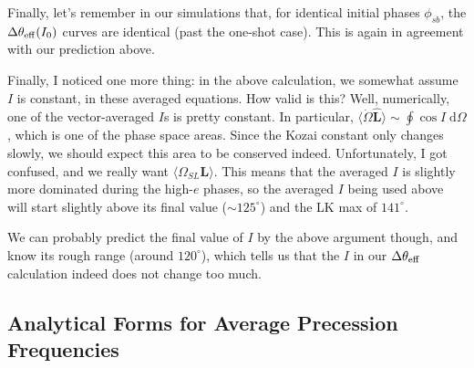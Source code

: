 \documentclass[11pt,
        usenames, %
        dvipsnames %
    ]{article}
\newcommand*{\bm}[1]{\boldsymbol{\mathbf{#1}}}
\newcommand*{\uv}[1]{\hat{\bm{#1}}}
\newcommand*{\ev}[1]{\langle#1\rangle}
\begin{document}
Finally, let's remember in our simulations that, for identical initial phases
$\phi_{sb}$, the $\Delta \theta_{\rm eff}(I_0)$ curves are identical (past the
one-shot case). This is again in agreement with our prediction above.

Finally, I noticed one more thing: in the above calculation, we somewhat assume
$I$ is constant, in these averaged equations. How valid is this? Well,
numerically, one of the vector-averaged $I$s is pretty constant. In particular,
$\ev{\dot{\Omega}\uv{L}} \sim \oint \cos I \;\mathrm{d}\Omega$, which is one of
the phase space areas. Since the Kozai constant only changes slowly, we should
expect this area to be conserved indeed. Unfortunately, I got confused, and we
really want $\ev{\Omega_{SL} \bm{L}}$. This means that the averaged $I$ is
slightly more dominated during the high-$e$ phases, so the averaged $I$ being
used above will start slightly above its final value ($\sim 125^\circ$) and the
LK max of $141^\circ$.

We can probably predict the final value of $I$ by the above argument though, and
know its rough range (around $120^\circ$), which tells us that the $I$ in our
$\Delta \theta_{\rm eff}$ calculation indeed does not change too much.

\subsection{Analytical Forms for Average Precession Frequencies}
\end{document}
